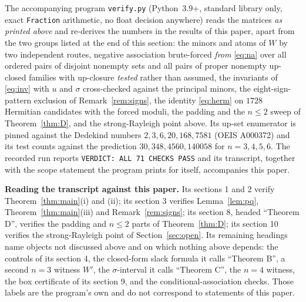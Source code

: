 \documentclass[11pt]{amsart}
\theoremstyle{remark}
\begin{document}
The accompanying program \texttt{verify.py} (Python~3.9+, standard library only, exact
\texttt{Fraction} arithmetic, no float decision anywhere) reads the matrices \emph{as printed
above} and re-derives the numbers in the results of this paper, apart from the two groups
listed at the end of this section: the minors and atoms of $W$ by two
independent routes, negative association brute-forced \emph{from} \eqref{eq:na} over all
ordered pairs of disjoint nonempty sets and all pairs of proper nonempty up-closed families
with up-closure \emph{tested} rather than assumed, the invariants of \eqref{eq:inv} with
$u$ and $\sigma$ cross-checked against the principal minors, the eight-sign-pattern exclusion
of Remark~\ref{rem:signs}, the identity \eqref{eq:herm} on $1728$ Hermitian candidates with
the forced moduli, the padding and the $n\le2$ sweep of
Theorem~\ref{thm:D}, and the strong-Rayleigh point above. Its
up-set enumerator is pinned against the Dedekind numbers $2,3,6,20,168,7581$
(OEIS A000372) and its test counts against the prediction $30,348,4560,140058$ for
$n=3,4,5,6$. The recorded run reports
\texttt{VERDICT: ALL 71 CHECKS PASS} and its transcript, together with the scope statement the
program prints for itself, accompanies this paper.

\medskip
\noindent\textbf{Reading the transcript against this paper.} Its sections 1 and 2 verify
Theorem~\ref{thm:main}(i) and (ii); its section 3 verifies Lemma~\ref{lem:pq},
Theorem~\ref{thm:main}(iii) and Remark~\ref{rem:signs}; its section 8, headed ``Theorem D'',
verifies the padding and
$n\le2$ parts of Theorem~\ref{thm:D}; its section 10 verifies the strong-Rayleigh point of
Section~\ref{sec:open}. Its remaining headings name objects not discussed above and on which
nothing above depends: the controls of its section 4, the closed-form slack formula it calls
``Theorem B'', a second $n=3$ witness $W'$, the $\sigma$-interval it calls ``Theorem C'', the
$n=4$ witness, the box certificate of its section 9, and the conditional-association checks.
Those labels are the program's own and do not correspond to statements of this paper.
\end{document}
